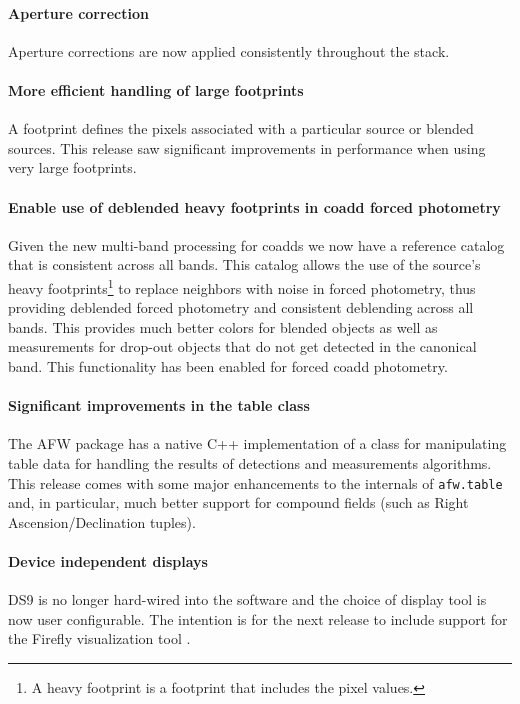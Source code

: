 \documentclass[11pt,twoside]{article}
\begin{document}
\paragraph{Aperture correction} Aperture corrections are now applied
consistently throughout the stack.

\paragraph{More efficient handling of large footprints} A footprint
defines the pixels associated with a particular source or blended
sources. This release saw significant improvements in performance when
using very large footprints.

\paragraph{Enable use of deblended heavy footprints in coadd forced
  photometry} Given the new multi-band processing for coadds we now
have a reference catalog that is consistent across all bands. This
catalog allows the use of the source's heavy footprints\footnote{A
  heavy footprint is a footprint that includes the pixel values.} to
replace neighbors with noise in forced photometry, thus providing
deblended forced photometry and consistent deblending across all
bands. This provides much better colors for blended objects as well as
measurements for drop-out objects that do not get detected in the
canonical band. This functionality has been enabled for forced coadd
photometry.

\paragraph{Significant improvements in the table class} The AFW package
has a native C++ implementation of a class for manipulating table data
for handling the results of detections and measurements
algorithms. This release comes with some major enhancements to the
internals of \texttt{afw.table} and, in particular, much better
support for compound fields (such as Right Ascension/Declination tuples).

\paragraph{Device independent displays} DS9
\citep{2011ASPC..442..633J} is no longer hard-wired into the software
and the choice of display tool is now user configurable.  The
intention is for the next release to include support for the Firefly
visualization tool \citep{O10-1_adassxxv}.
\end{document}
